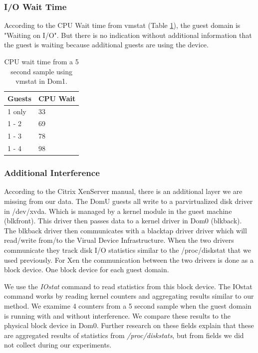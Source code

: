 \subsubsection{I/O Wait Time}
According to the CPU Wait time from vmstat (Table \ref{tab:vmstat}), the guest domain is "Waiting on I/O".  
But there is no indication without additional information that the guest is waiting because additional guests are using the device.

\begin{table}[h]
\begin{tabular}{ l p{5cm} }
    Guests &  CPU Wait \\
    \hline
    1 only &  33  \\
    1 - 2  &  69  \\
    1 - 3  &  78  \\ 
    1 - 4  &  98  \\
    \hline
\end{tabular}
\caption{CPU wait time from a 5 second sample using vmstat in Dom1.}
\label{tab:vmstat}
\end{table}

\subsubsection{Additional Interference}
According to the Citrix XenServer manual, there is an additional layer we are missing from our data.   
The DomU guests all write to a parvirtualized disk driver in /dev/xvda.  Which is managed by a kernel module in the guest machine (blkfront).  This driver then passes data to a kernel driver in Dom0 (blkback).  The blkback driver then communicates with a blacktap driver driver which will read/write from/to the Virual Device Infrastructure.   When the two drivers communicate they track disk I/O statistics similar to the /proc/diskstat that we used previously.  For Xen the communication between the two drivers is done as a block device.  One block device for each guest domain.

We use the \emph{IOstat} command to read statistics from this block device.  The IOstat command works by reading kernel counters and aggregating results similar to our method.  We examime 4 counters from a 5 second sample when the guest domain is running with and without interference.  We compare these results to the physical block device in Dom0.
Further research on these fields explain that these are aggregated results of statistics from \emph{/proc/diskstats}, but from fields we did not collect during our experiments.


